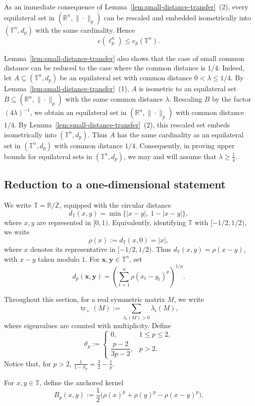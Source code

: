 \documentclass[11pt]{article}
\theoremstyle{definition}
\newcommand{\T}{\mathbb T}
\newcommand{\R}{\mathbb R}
\newcommand{\Z}{\mathbb Z}
\begin{document}
As an immediate consequence of Lemma~\ref{lem:small-distance-transfer}~(2),
every equilateral set in \((\mathbb{R}^n,\|\cdot\|_p)\) can be rescaled and
embedded isometrically into \((\T^n,d_p)\) with the same cardinality. Hence
\[
e(\ell^n_p)\le e_p(\T^n).
\]
	
	Lemma~\ref{lem:small-distance-transfer} also shows that the case of small common distance can be reduced
	to the case where the common distance is \(1/4\). Indeed, let
	\(A\subseteq(\T^n,d_p)\) be an equilateral set with common distance
	\(0<\lambda\le 1/4\). By Lemma~\ref{lem:small-distance-transfer}~(1), \(A\)
	is isometric to an equilateral set \(B\subseteq(\mathbb{R}^n,\|\cdot\|_p)\)
	with the same common distance \(\lambda\). Rescaling \(B\) by the factor
	\((4\lambda)^{-1}\), we obtain an equilateral set in
	\((\mathbb{R}^n,\|\cdot\|_p)\) with common distance \(1/4\). By
	Lemma~\ref{lem:small-distance-transfer}~(2), this rescaled set embeds
	isometrically into \((\T^n,d_p)\). Thus \(A\) has the same cardinality as an
	equilateral set in \((\T^n,d_p)\) with common distance \(1/4\).
	Consequently, in proving upper bounds for equilateral sets in
	\((\T^n,d_p)\), we may and will assume that
	$\lambda\ge \frac14.$

\subsection{Reduction to a one-dimensional statement}

We write \(\T=\R/\Z\), equipped with the circular distance
\[
d_{\T}(x,y)=\min\{|x-y|,\ 1-|x-y|\},
\]
where \(x,y\) are represented in \([0,1)\). Equivalently, identifying
\(\T\) with \([-1/2,1/2)\), we write
\[
\rho(x):=d_{\T}(x,0)=|x|,
\]
where \(x\) denotes its representative in \([-1/2,1/2)\). Thus
\(d_{\T}(x,y)=\rho(x-y)\), with \(x-y\) taken modulo \(1\). For
\(\boldsymbol{x},\boldsymbol{y}\in\T^n\), set
\[
d_p(\boldsymbol{x},\boldsymbol{y})
=
\left(\sum_{t=1}^n \rho(x_t-y_t)^p\right)^{1/p}.
\]

Throughout this section, for a real symmetric matrix \(M\), we write
\[
\operatorname{tr}_+(M):=\sum_{\lambda_i(M)>0}\lambda_i(M),
\]
where eigenvalues are counted with multiplicity. Define
\[
\vartheta_p :=
\begin{cases}
0,&1\le p\le 2,\\[1mm]
\dfrac{p-2}{3p-2},&p>2.
\end{cases}
\]
Notice that, for \(p>2\),
\(
\frac1{1-\vartheta_p}
=
\frac32-\frac1p.
\)

For \(x,y\in\T\), define the anchored kernel
\[
B_p(x,y):=
\frac12\bigl(\rho(x)^p+\rho(y)^p-\rho(x-y)^p\bigr).
\]
\end{document}
